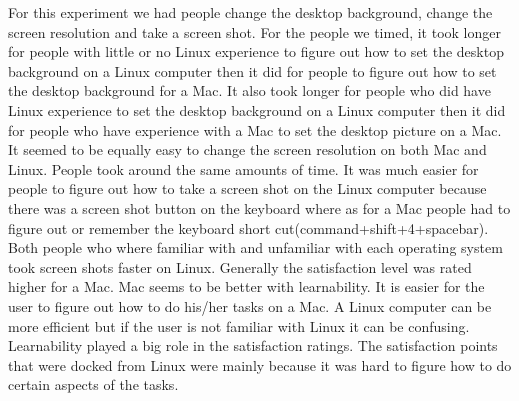 \documentclass[12pt, onesided, letterpaper]{report}
\begin{document}
For this experiment we had people change the desktop background, change the
screen resolution and take a screen shot. For the people we timed, it took longer
for people with little or no Linux experience to figure out how to set the desktop
background on a Linux computer then it did for people to figure out how to set
the desktop background for a Mac. It also took longer for people who did have
Linux experience to set the desktop background on a Linux computer then it did
for people who have experience with a Mac to set the desktop picture on a Mac. It
seemed to be equally easy to change the screen resolution on both Mac and Linux.
People took around the same amounts of time. It was much easier for people to
figure out how to take a screen shot on the Linux computer because there was a
screen shot button on the keyboard where as for a Mac people had to figure out or
remember the keyboard short cut(command+shift+4+spacebar). Both people who
where familiar with and unfamiliar with each operating system took screen shots
faster on Linux. Generally the satisfaction level was rated higher for a Mac. Mac
seems to be better with learnability. It is easier for the user to figure out how to
do his/her tasks on a Mac. A Linux computer can be more efficient but if the user
is not familiar with Linux it can be confusing. Learnability played a big role in the
satisfaction ratings. The satisfaction points that were docked from Linux were
mainly because it was hard to figure how to do certain aspects of the tasks.
\end{document}
